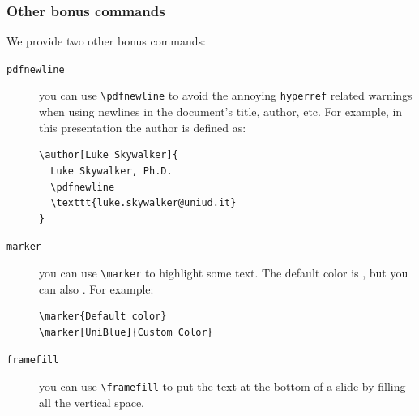 \documentclass{article}
\begin{document}


\begin{frame}
\frametitle{Other bonus commands}

We provide two other bonus commands:
\begin{description}
\item[\texttt{pdfnewline}] you can use \texttt{\textbackslash pdfnewline} to avoid the annoying \texttt{hyperref} related warnings when using newlines in the document's title, author, etc. For example, in this presentation the author is defined as:
\begin{verbatim}
\author[Luke Skywalker]{
  Luke Skywalker, Ph.D.
  \pdfnewline
  \texttt{luke.skywalker@uniud.it}
}
\end{verbatim}
\item[\texttt{marker}] you can use \texttt{\textbackslash marker} to highlight some text. The default color is , but you can also . For example:
\begin{verbatim}
\marker{Default color}
\marker[UniBlue]{Custom Color}
\end{verbatim}
\item[\texttt{framefill}] you can use \texttt{\textbackslash framefill} to put the text at the bottom of a slide by filling all the vertical space.
\end{description}

\end{frame}
\end{document}
